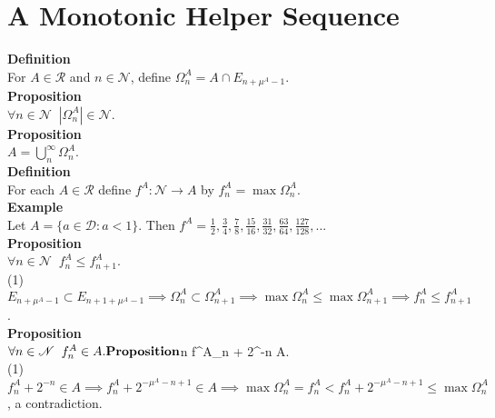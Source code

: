 \documentclass{article}
\newcommand{\targetset}{ \mathscr{R}}
\newcommand{\sourceset}{ \mathscr{D}}
\newcommand{\nondisjoints}{E}
\newcommand{\naturals}{ \mathscr{N}}
\newcommand{\climber}{ f}
\newcommand{\elt}{a}
\newcommand{\interceptor}{\Omega}
\newcommand{\wed}{\mu}
\begin{document}
\section{A Monotonic Helper Sequence}


\textbf{Definition}\\
For $A \in \targetset$ and $ n \in \naturals$, define $\interceptor ^A_n = A \cap \nondisjoints_{n + \wed^A - 1}$.\\

\textbf{Proposition}\\
$\forall n \in \naturals \;\; |\interceptor^A_n| \in \naturals$.\\

\textbf{Proposition}\\
$A = \bigcup_n^\infty \interceptor^A_n$.\\


\textbf{Definition}\\
For each $A \in \targetset$ define $\climber^A: \naturals \to A$ by $\climber^A_n = \max \interceptor^A_n$.\\

\textbf{Example}\\
Let $A = \{ \elt \in \sourceset :\elt < 1 \}.$ Then  $\climber^A = \frac{1}{2}, \frac{3}{4},\frac{7}{8},\frac{15}{16},\frac{31}{32},\frac{63}{64},\frac{127}{128}, ... $\\

\textbf{Proposition}\\
$\forall n \in \naturals  \;\;f^A_n \le f^A_{n + 1}$.\\

(1) $\nondisjoints_{n+ \wed^A - 1} \subset \nondisjoints_{n+1 + \wed^A - 1} \implies \interceptor^A_n \subset \interceptor^A_{n+1} \implies  \max \interceptor^A_n \le \max \interceptor^A_{n+1} \implies f^A_n \le f^A_{n + 1}$.\\

 \textbf{Proposition}\\
 $\forall n \in \naturals \;\; f^A_n \in A.\\

\textbf{Proposition}\\
$\forall n \in \naturals \;\; f^A_n + 2^{-n} \notin A.\\

(1)$f^A_n +2^{-n} \in A \implies f^A_n + 2^{-\mu^A - n + 1} \in A \implies \max \interceptor^A_n = f^A_n < f^A_n + 2^{-\mu^A - n + 1} \le \max \interceptor^A_n$, a contradiction.\\
\end{document}
